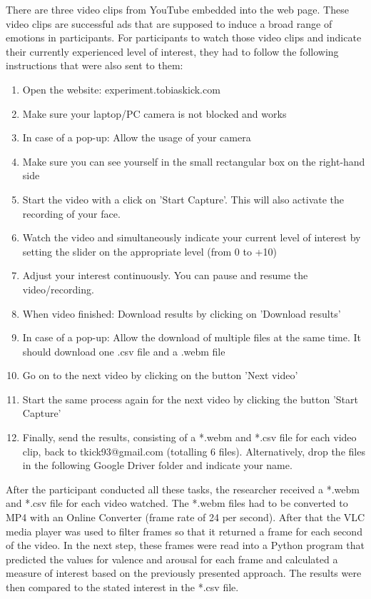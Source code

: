 There are three video clips from YouTube embedded into the web page. These video clips are successful ads that are supposed to induce a broad range of emotions in participants.
\newline\newline
For participants to watch those video clips and indicate their currently experienced level of interest, they had to follow the following instructions that were also sent to them:

\begin{enumerate}[noitemsep]
    \item Open the website: experiment.tobiaskick.com
    \item Make sure your laptop/PC camera is not blocked and works
    \item In case of a pop-up: Allow the usage of your camera
    \item Make sure you can see yourself in the small rectangular box on the right-hand side
    \item Start the video with a click on 'Start Capture'. This will also activate the recording of your face.
    \item Watch the video and simultaneously indicate your current level of interest by setting the slider on the appropriate level (from 0 to +10)
    \item Adjust your interest continuously. You can pause and resume the video/recording.
    \item When video finished: Download results by clicking on 'Download results'
    \item In case of a pop-up: Allow the download of multiple files at the same time. It should download one .csv file and a .webm file
    \item Go on to the next video by clicking on the button 'Next video'
    \item Start the same process again for the next video by clicking the button 'Start Capture'
    \item Finally, send the results, consisting of a *.webm and *.csv file for each video clip, back to tkick93@gmail.com (totalling 6 files). Alternatively, drop the files in the following Google Driver folder and indicate your name.
\end{enumerate}

After the participant conducted all these tasks, the researcher received a *.webm and *.csv file for each video watched. The *.webm files had to be converted to MP4 with an Online Converter (frame rate of 24 per second). After that the VLC media player was used to filter frames so that it returned a frame for each second of the video.
\newline\newline
In the next step, these frames were read into a Python program that predicted the values for valence and arousal for each frame and calculated a measure of interest based on the previously presented approach. The results were then compared to the stated interest in the *.csv file.


